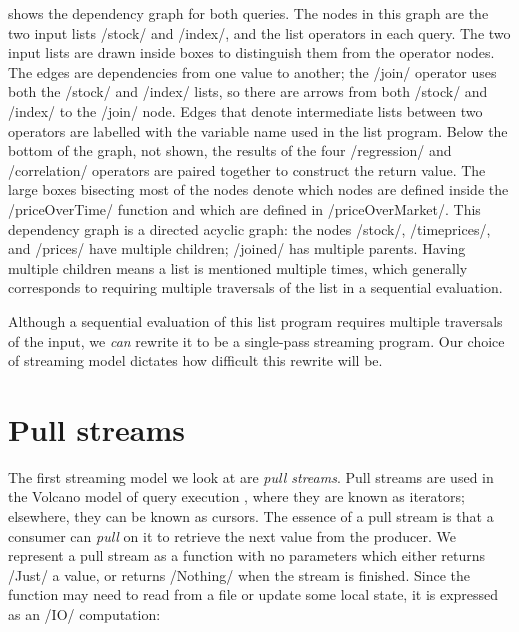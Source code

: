 % 

 shows the dependency graph for both queries.
The nodes in this graph are the two input lists \Hs/stock/ and \Hs/index/, and the list operators in each query.
The two input lists are drawn inside boxes to distinguish them from the operator nodes.
The edges are dependencies from one value to another; the \Hs/join/ operator uses both the \Hs/stock/ and \Hs/index/ lists, so there are arrows from both \Hs/stock/ and \Hs/index/ to the \Hs/join/ node.
Edges that denote intermediate lists between two operators are labelled with the variable name used in the list program.
Below the bottom of the graph, not shown, the results of the four \Hs/regression/ and \Hs/correlation/ operators are paired together to construct the return value.
The large boxes bisecting most of the nodes denote which nodes are defined inside the \Hs/priceOverTime/ function and which are defined in \Hs/priceOverMarket/.
This dependency graph is a directed acyclic graph: the nodes \Hs/stock/, \Hs/timeprices/, and \Hs/prices/ have multiple children; \Hs/joined/ has multiple parents.
Having multiple children means a list is mentioned multiple times, which generally corresponds to requiring multiple traversals of the list in a sequential evaluation.

Although a sequential evaluation of this list program requires multiple traversals of the input, we \emph{can} rewrite it to be a single-pass streaming program.
Our choice of streaming model dictates how difficult this rewrite will be.

\section{Pull streams}
\label{taxonomy/pull}

The first streaming model we look at are \emph{pull streams}.
Pull streams are used in the Volcano model of query execution \citep{graefe1989volcano}, where they are known as iterators; elsewhere, they can be known as cursors.
The essence of a pull stream is that a consumer can \emph{pull} on it to retrieve the next value from the producer.
We represent a pull stream as a function with no parameters which either returns \Hs/Just/ a value, or returns \Hs/Nothing/ when the stream is finished.
Since the function may need to read from a file or update some local state, it is expressed as an \Hs/IO/ computation:

